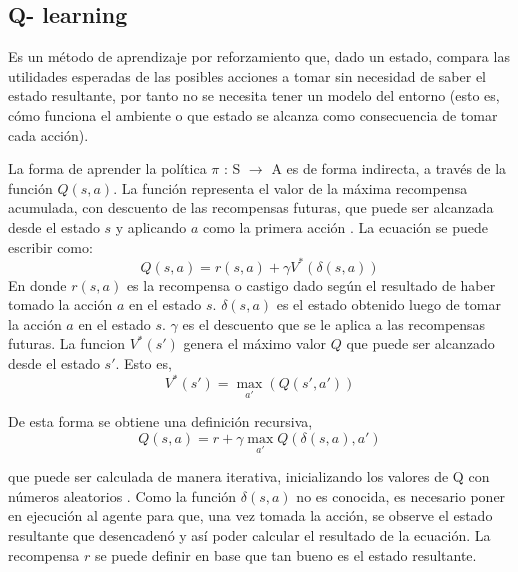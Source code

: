 \subsection{Q- learning}\label{Qlearning}

Es un método de aprendizaje por reforzamiento que, dado un estado, compara las utilidades esperadas de las posibles acciones a tomar sin necesidad de saber el estado resultante, por tanto no se necesita tener un modelo del entorno\cite{peterNorvig} (esto es, cómo funciona el ambiente o que estado se alcanza como consecuencia de tomar cada acción).

La forma de aprender la política $\pi$ : S $\to$ A es de forma indirecta, a través de la función $Q(s,a)$. La función representa el valor de la máxima recompensa acumulada, con descuento de las recompensas futuras, que puede ser alcanzada desde el estado $s$ y aplicando $a$ como la primera acción \cite{Mitchell}. La ecuación se puede escribir como:
\[Q(s,a) = r(s,a) + \gamma V^*(\delta(s,a))\]
En donde $r(s,a)$ es la recompensa o castigo dado según el resultado de haber tomado la acción $a$ en el estado $s$. $\delta(s,a)$ es el estado obtenido luego de tomar la acción $a$ en el estado $s$. $\gamma$ es el descuento que se le aplica a las recompensas futuras. La funcion $V^*(s')$ genera el máximo valor $Q$ que puede ser alcanzado desde el estado $s'$. Esto es,
\[V^*(s')= \max_{a'} (Q(s',a'))\] 

De esta forma se obtiene una definición recursiva,
\[Q(s,a) = r + \gamma \max_{a'} Q(\delta(s,a),a')\]

que puede ser calculada de manera iterativa, inicializando los valores de Q con números aleatorios \cite{Mitchell}. Como la función $\delta(s,a)$ no es conocida, es necesario poner en ejecución al agente para que, una vez tomada la acción, se observe el estado resultante que desencadenó y así poder calcular el resultado de la ecuación. La recompensa $r$ se puede definir en base que tan bueno es el estado resultante. 


